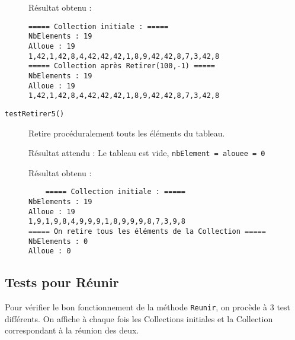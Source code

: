 \documentclass[10pt]{article}
\begin{document}
\begin{description}
	Résultat obtenu :
	\begin{verbatim}
===== Collection initiale : =====
NbElements : 19
Alloue : 19
1,42,1,42,8,4,42,42,42,1,8,9,42,42,8,7,3,42,8
===== Collection après Retirer(100,-1) =====
NbElements : 19
Alloue : 19
1,42,1,42,8,4,42,42,42,1,8,9,42,42,8,7,3,42,8
\end{verbatim}
	
	\item[\texttt{testRetirer5()}] Retire procéduralement touts les éléments du tableau.
	
	Résultat attendu : Le tableau est vide, \texttt{nbElement = alouee = 0}
	
	Résultat obtenu :
	\begin{verbatim}
	===== Collection initiale : =====
NbElements : 19
Alloue : 19
1,9,1,9,8,4,9,9,9,1,8,9,9,9,8,7,3,9,8
===== On retire tous les éléments de la Collection =====
NbElements : 0
Alloue : 0
\end{verbatim}
\end{description}

\subsection{Tests pour Réunir}
Pour vérifier le bon fonctionnement de la méthode \texttt{Reunir}, on procède à 3 test différents. On affiche à chaque fois les Collections initiales et la Collection correspondant à la réunion des deux.
\end{document}
